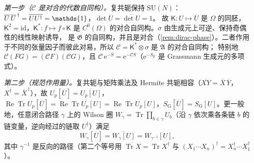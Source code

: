 \documentclass[UTF8,a4paper,11pt,fontset=fandol]{ctexart}
\makeatletter
\let\amsmathbb\mathbb
\renewcommand{\mathbb}[1]{\ifx1#1\mathds{1}\else\amsmathbb{#1}\fi}
\theoremstyle{cplain}
\theoremstyle{cdefinition}
\theoremstyle{cremark}
\renewcommand{\proofname}{证明}
\renewenvironment{proof}[1][\proofname]{\par\pushQED{\qed}\normalfont\topsep6\p@\@plus6\p@\relax
  \trivlist\item[\hskip\labelsep\itshape #1\hspace{0.5em}]\ignorespaces}{\popQED\endtrivlist\@endpefalse}
\numberwithin{equation}{section}
\DeclareMathOperator{\Tr}{Tr}
\DeclareMathOperator{\Real}{Re}
\newcommand{\Cop}{\mathcal{C}}                       %
\newcommand{\ee}{\mathrm{e}}                        %
\makeatother
\begin{document}
\begin{proof}
\emph{第一步（$\Cop$ 是对合的代数自同构）。}复共轭保持 $\mathrm{SU}(N)$：$\overline U\,\overline U^{\,\dagger}=\overline{UU^\dagger}=\mathbb 1$，$\det\overline U=\overline{\det U}=1$。
故 $\mathsf K:U\mapsto\overline U$ 是 $\Omega$ 的同胚，$\mathsf K^2=\mathrm{id}$，$\mathsf K^*:f\mapsto f\circ\mathsf K$ 是 $C^0(\Omega)$ 的对合自同构。$\sigma$ 由生成元上可逆、保持奇偶性的线性映射诱导，
是 $\mathfrak G$ 的自同构，并且是对合（\cref{rem:dirac-phase}）。二者作用于不同的张量因子而彼此对易，所以 $\Cop=\mathsf K^*\otimes\sigma$ 是 $\mathfrak A$ 的对合自同构；
特别地 $\Cop(FG)=(\Cop F)(\Cop G)$，且 $\Cop\,\ee^{-S}=\ee^{-\Cop S}$（$\ee^{-S_{\mathrm F}}$ 是 Grassmann 生成元的多项式）。

\emph{第二步（规范作用量）。}复共轭与矩阵乘法及 Hermite 共轭相容（$\overline{XY}=\overline X\,\overline Y$，$\overline{X^\dagger}=\overline X^{\,\dagger}$），故 $U_p[\overline U]=\overline{U_p[U]}$，
$\Real\Tr U_p[\overline U]=\Real\overline{\Tr U_p[U]}=\Real\Tr U_p[U]$，$S_{\mathrm G}[\overline U]=S_{\mathrm G}[U]$。更一般地，任意闭合路径 $\gamma$ 上的 Wilson 圈 $W_\gamma=\Tr\prod_{b\in\gamma}U_b$（沿 $\gamma$ 依次乘各条链 $b$ 的链变量，逆向经过的链取 $U^\dagger$）满足
\begin{equation}\label{eq:np-wilsonloop}
W_\gamma[\overline U]=\overline{W_\gamma[U]}=W_{\gamma^{-1}}[U],
\end{equation}
其中 $\gamma^{-1}$ 是反向的路径（第二个等号用 $\overline{\Tr X}=\Tr X^\dagger$ 与 $(X_1\cdots X_n)^\dagger=X_n^\dagger\cdots X_1^\dagger$）。


\end{proof}
\end{document}

